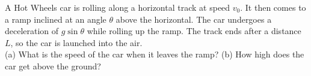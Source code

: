 A Hot Wheels car is rolling along a horizontal track at speed $v_0$.
It then comes to a ramp inclined at an angle $\theta$ above the horizontal.
The car undergoes a
deceleration of $g \sin \theta$ while rolling up the ramp. The track ends
after a distance $L$, so the car is launched into the air.\\
%
(a) What is the speed of the car when it leaves the ramp?\answercheck\hwendpart
%
(b) How high does the car get above the ground?\answercheck
